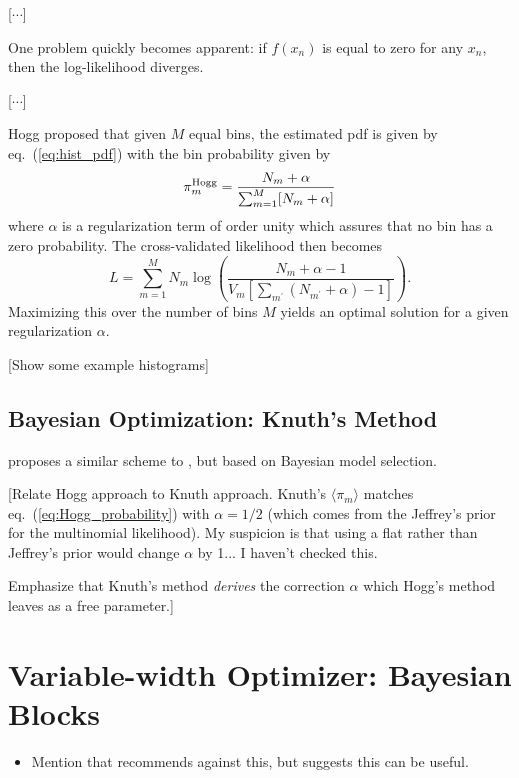 \documentclass[12pt]{article}
\newcommand{\comment}[1]{{\color{blue} [#1]}}
\newcommand{\eqn}[1]{eq.~(\ref{eq:#1})}
\begin{document}
\comment{$\cdots$}

One problem quickly becomes apparent: if $f(x_n)$ is equal to zero for
any $x_n$, then the log-likelihood diverges.

\comment{$\cdots$}

Hogg proposed that given $M$ equal bins, the estimated pdf is given by
\eqn{hist_pdf} with the bin probability given by
\begin{equation}
  \label{eq:Hogg_probability}
  \pi_m^{\rm Hogg} = \frac{N_m + \alpha}{\sum_{m=1}^M[N_m + \alpha]}
\end{equation}
where $\alpha$ is a regularization term of order unity which assures that
no bin has a zero probability.  The cross-validated likelihood then becomes
\begin{equation}
  L = \sum_{m=1}^M N_m \log\left(
    \frac{N_m + \alpha - 1}
    {V_m\left[
        \sum_{m^\prime}\left(
          N_{m^\prime} + \alpha
        \right) - 1
      \right]}
    \right).
\end{equation}
Maximizing this over the number of bins $M$ yields an optimal solution for
a given regularization $\alpha$.

\comment{Show some example histograms}

\subsection{Bayesian Optimization: Knuth's Method}
\citet{Knuth2006} proposes a similar scheme to \citet{Hogg2008}, but based
on Bayesian model selection.

\comment{Relate Hogg approach to Knuth approach.  Knuth's $\langle\pi_m\rangle$
  matches \eqn{Hogg_probability} with $\alpha = 1/2$
  (which comes from the Jeffrey's prior for the multinomial
  likelihood).  
  My suspicion is that using a flat rather than Jeffrey's prior would change
  $\alpha$ by 1... I haven't checked this.
  
  Emphasize that Knuth's method {\it derives} the correction
  $\alpha$ which Hogg's method leaves as a free parameter.}

\section{Variable-width Optimizer: Bayesian Blocks}
\label{sec:variable_width}
\begin{itemize}
  \item Mention that \citet{Birge2003} recommends against this, but
    \citet{Scott1992} suggests this can be useful.
\end{itemize}
\end{document}

